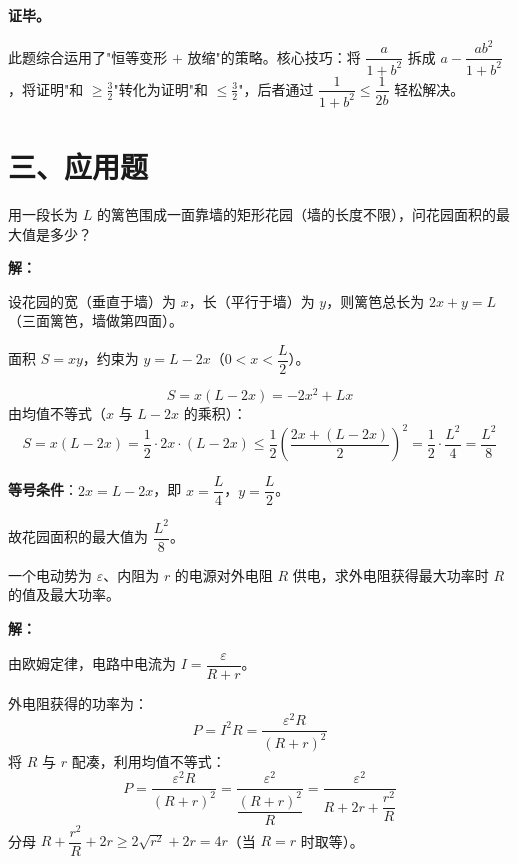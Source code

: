 \documentclass[12pt, a4paper]{ctexart}
\begin{document}
\textbf{证毕。}

\begin{tipbox}[方法总结]
此题综合运用了"恒等变形 $+$ 放缩"的策略。核心技巧：将 $\dfrac{a}{1+b^2}$ 拆成 $a - \dfrac{ab^2}{1+b^2}$，将证明"和 $\geqslant \frac{3}{2}$"转化为证明"和 $\leqslant \frac{3}{2}$"，后者通过 $\dfrac{1}{1+b^2} \leqslant \dfrac{1}{2b}$ 轻松解决。
\end{tipbox}

\newpage

\section*{\textcolor{apppurple}{三、应用题}}

\begin{appbox}
用一段长为 $L$ 的篱笆围成一面靠墙的矩形花园（墙的长度不限），问花园面积的最大值是多少？
\end{appbox}

\textbf{解：}

设花园的宽（垂直于墙）为 $x$，长（平行于墙）为 $y$，则篱笆总长为 $2x+y = L$（三面篱笆，墙做第四面）。

面积 $S = xy$，约束为 $y = L-2x$（$0 < x < \dfrac{L}{2}$）。

\[
S = x(L-2x) = -2x^2+Lx
\]
由均值不等式（$x$ 与 $L-2x$ 的乘积）：
\[
S = x(L-2x) = \frac{1}{2}\cdot 2x \cdot (L-2x) \leqslant \frac{1}{2}\left(\frac{2x+(L-2x)}{2}\right)^2 = \frac{1}{2}\cdot\frac{L^2}{4} = \frac{L^2}{8}
\]

\textbf{等号条件}：$2x = L-2x$，即 $x = \dfrac{L}{4}$，$y = \dfrac{L}{2}$。

故花园面积的最大值为 $\boxed{\dfrac{L^2}{8}}$。

\begin{appbox}
一个电动势为 $\varepsilon$、内阻为 $r$ 的电源对外电阻 $R$ 供电，求外电阻获得最大功率时 $R$ 的值及最大功率。
\end{appbox}

\textbf{解：}

由欧姆定律，电路中电流为 $I = \dfrac{\varepsilon}{R+r}$。

外电阻获得的功率为：
\[
P = I^2 R = \frac{\varepsilon^2 R}{(R+r)^2}
\]
将 $R$ 与 $r$ 配凑，利用均值不等式：
\[
P = \frac{\varepsilon^2 R}{(R+r)^2} = \frac{\varepsilon^2}{\dfrac{(R+r)^2}{R}} = \frac{\varepsilon^2}{R+2r+\dfrac{r^2}{R}}
\]
分母 $R+\dfrac{r^2}{R}+2r \geqslant 2\sqrt{r^2}+2r = 4r$（当 $R = r$ 时取等）。
\end{document}
